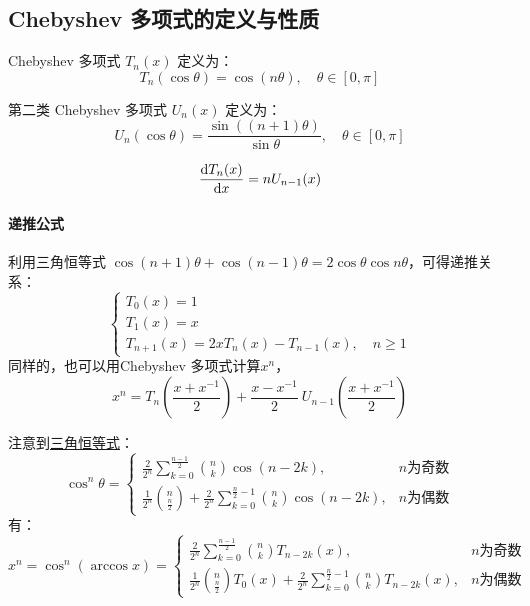 \subsection{Chebyshev 多项式的定义与性质}

\begin{theorem}
    Chebyshev 多项式 \(T_n(x)\) 定义为：
    \[
        T_n(\cos \theta) = \cos(n \theta), \quad \theta \in [0, \pi]
    \]
\end{theorem}

\begin{theorem}
    第二类 Chebyshev 多项式 \(U_n(x)\) 定义为：
    \[
        U_n(\cos \theta) = \frac{\sin((n+1) \theta)}{\sin \theta},
        \quad \theta \in
        [0, \pi]
    \]
\end{theorem}

\[
    \odv{T_{n}(x)}{x} = n U_{n-1}(x)
\]
\paragraph{递推公式}
利用三角恒等式 \(\cos(n+1)\theta + \cos(n-1)\theta = 2\cos\theta \cos n\theta\)，可得递推关系：
\begin{equation}
    \begin{cases}
        T_0(x) = 1 \\
        T_1(x) = x \\
        T_{n+1}(x) = 2x T_n(x) - T_{n-1}(x), \quad n \geq 1
    \end{cases}
\end{equation}
同样的，也可以用Chebyshev 多项式计算\(x^{n} \)，
\[
    x^{n}=T_{n}\!\left({\frac
    {x+x^{-1}}{2}}\right)+{\frac
    {x-x^{-1}}{2}}\ U_{n-1}\!\left({\frac {x+x^{-1}}{2}}\right)
\]

注意到\href{https://en.wikipedia.org/wiki/List_of_trigonometric_identities#Table}{三角恒等式}：
\[
    \cos^n \theta =
    \begin{cases}
        {\frac {2}{2^{n}}}\sum _{k=0}^{\frac
        {n-1}{2}}{\binom {n}{k}}\cos (n-2k),
        & n \text{为奇数} \\
        {\frac {1}{2^{n}}}{\binom {n}{\frac
        {n}{2}}}+{\frac {2}{2^{n}}}\sum _{k=0}^{{\frac {n}{2}}-1}{\binom
        {n}{k}}\cos (n-2k), & n \text{为偶数}
    \end{cases}
\]
有：
\[
    x^{n} = \cos^{n}(\arccos x) =
    \begin{cases}
        {\frac {2}{2^{n}}}\sum _{k=0}^{\frac
        {n-1}{2}}{\binom {n}{k}}T_{n-2k}(x),
        & n \text{为奇数} \\
        \frac {1}{2^{n}}\binom {n}{\frac
        {n}{2}}T_{0}(x)+{\frac {2}{2^{n}}}\sum _{k=0}^{{\frac {n}{2}}-1}{\binom
        {n}{k}}T_{n-2k}(x), & n \text{为偶数}
    \end{cases}
\]

